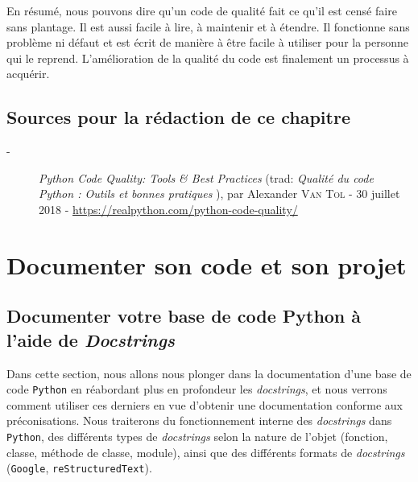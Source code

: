 \documentclass[a4paper,12pt]{book}
\begin{document}
En résumé, nous pouvons dire qu'un code de qualité fait ce qu'il est censé faire sans plantage. Il est aussi facile à lire, à maintenir et à étendre. Il fonctionne sans problème ni défaut et est écrit de manière à être facile à utiliser pour la personne qui le reprend. L'amélioration de la qualité du code est finalement un processus à acquérir.
\medskip

\section*{Sources pour la rédaction de ce chapitre}
\begin{description}
	\item[-] \textit{Python Code Quality: Tools \& Best Practices} (trad: \og \textit{Qualité du code Python : Outils et bonnes pratiques} \fg{}), par Alexander \textsc{Van Tol} - 30 juillet 2018 - \url{https://realpython.com/python-code-quality/}
\end{description}
\medskip

\chapter{Documenter son code et son projet}\label{documentercodeprojet}
\section{Documenter votre base de code Python à l'aide de \textit{Docstrings}}
Dans cette section, nous allons nous plonger dans la documentation d'une base de code \texttt{Python} en réabordant plus en profondeur les \textit{docstrings}, et nous verrons comment utiliser ces derniers en vue d'obtenir une documentation conforme aux préconisations. Nous traiterons du fonctionnement interne des \textit{docstrings} dans \texttt{Python}, des différents types de \textit{docstrings} selon la nature de l'objet (fonction, classe, méthode de classe, module), ainsi que des différents formats de \textit{docstrings} (\texttt{Google}, \texttt{reStructuredText}).
\medskip
\end{document}
